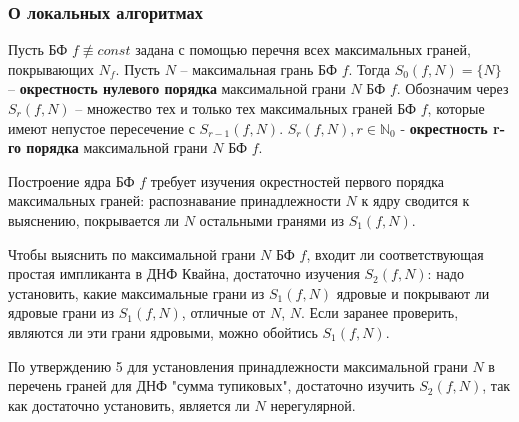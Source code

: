 \documentclass[11pt]{article}
\newcounter{th}\setcounter{th}{0}
\begin{document}
\subsubsection{О локальных алгоритмах}
\label{sec:orgafd7546}
Пусть БФ \(f \not\equiv const\) задана с помощью перечня всех максимальных граней, покрывающих
\(N_f\). Пусть \(N\) -- максимальная грань БФ \(f\). Тогда \(S_0(f, N) = \{N\}\) -- \textbf{окрестность
нулевого порядка} максимальной грани \(N\) БФ \(f\). Обозначим через \(S_r(f, N)\) -- множество тех
и только тех максимальных граней БФ \(f\), которые имеют непустое пересечение с \(S_{r - 1}(f, N)\).
\(S_r(f, N), r \in \mathbb{N}_0\) - \textbf{окрестность r-го порядка} максимальной грани \(N\) БФ \(f\).

Построение ядра БФ \(f\) требует изучения окрестностей первого порядка максимальных граней:
распознавание принадлежности \(N\) к ядру сводится к выяснению, покрывается ли \(N\) остальными
гранями из \(S_1(f, N)\).

Чтобы выяснить по максимальной грани \(N\) БФ \(f\), входит ли соответствующая простая импликанта
в ДНФ Квайна, достаточно изучения \(S_2(f, N)\): надо установить, какие максимальные грани из
\(S_1(f, N)\) ядровые и покрывают ли ядровые грани из \(S_1(f, N)\), отличные от \(N\), \(N\). Если
заранее проверить, являются ли эти грани ядровыми, можно обойтись \(S_1(f, N)\).

По утверждению 5 для установления принадлежности максимальной грани \(N\) в перечень граней для
ДНФ "сумма тупиковых", достаточно изучить \(S_2(f, N)\), так как достаточно установить, является
ли \(N\) нерегулярной.
\end{document}

